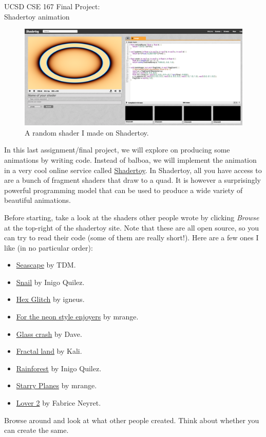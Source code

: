 



\begin{center}
    {\large
    UCSD CSE 167 Final Project: \\
    \vspace{0.3cm}
    \Large
    Shadertoy animation}
\end{center}

\begin{figure}[ht]
    \centering
    \includegraphics[width=0.80\linewidth]{imgs/circle_shader.png}
    \caption{A random shader I made on Shadertoy.}
    \label{fig:teaser}
\end{figure}

In this last assignment/final project, we will explore on producing some animations by writing code.
Instead of balboa, we will implement the animation in a very cool online service called \href{shadertoy.com}{Shadertoy}. In Shadertoy, all you have access to are a bunch of fragment shaders that draw to a quad. It is however a surprisingly powerful programming model that can be used to produce a wide variety of beautiful animations.

Before starting, take a look at the shaders other people wrote by clicking \emph{Browse} at the top-right of the shadertoy site. Note that these are all open source, so you can try to read their code (some of them are really short!). Here are a few ones I like (in no particular order):
\begin{itemize}
	\item \href{https://www.shadertoy.com/view/Ms2SD1}{Seascape} by TDM. 
	\item \href{https://www.shadertoy.com/view/ld3Gz2}{Snail} by Inigo Quilez.
	\item \href{https://www.shadertoy.com/view/lfscD7}{Hex Glitch} by igneus.
	\item \href{https://www.shadertoy.com/view/ddcGW8}{For the neon style enjoyers} by mrange.
	\item \href{https://www.shadertoy.com/view/4s23RW}{Glass crash} by Dave.
 	\item \href{https://www.shadertoy.com/view/XsBXWt}{Fractal land} by Kali.
 	\item \href{https://www.shadertoy.com/view/4ttSWf}{Rainforest} by Inigo Quilez.
 	\item \href{https://www.shadertoy.com/view/MfjyWK}{Starry Planes} by mrange.
	\item \href{https://www.shadertoy.com/view/ssjyWc}{Lover 2} by Fabrice Neyret.
\end{itemize}
Browse around and look at what other people created. Think about whether you can create the same.

